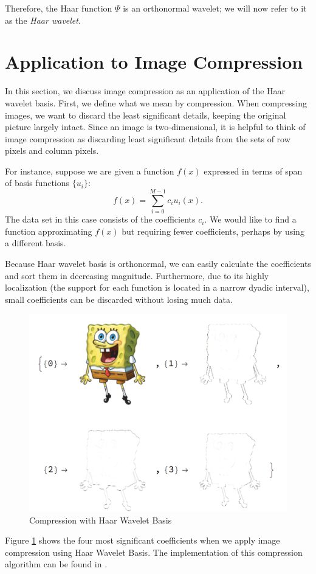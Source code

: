 \documentclass[11pt]{amsart}
\theoremstyle{theorem} %
\theoremstyle{definition}
\theoremstyle{example}
\theoremstyle{remark}
\numberwithin{equation}{section}
\begin{document}
Therefore, the Haar function $ \varPsi $ is an orthonormal wavelet; we will now refer to it as the \emph{Haar wavelet}.

\section{Application to Image Compression} \label{section:application}
In this section, we discuss image compression as an application of the Haar wavelet basis. First, we define what we mean by compression. When compressing images, we want to discard the least significant details, keeping the original picture largely intact. Since an image is two-dimensional, it is helpful to think of image compression as discarding least significant details from the sets of row pixels and column pixels. 

For instance, suppose we are given a function $ f(x) $ expressed in terms of span of basis functions $ \{ u_i \} $:
	\[ f(x) = \sum_{i=0}^{M-1} c_i u_i(x). \]
The data set in this case consists of the coefficients $ c_i $. We would like to find a function approximating $ f(x) $ but requiring fewer coefficients, perhaps by using a different basis.

Because Haar wavelet basis is orthonormal, we can easily calculate the coefficients and sort them in decreasing magnitude. Furthermore, due to its highly localization (the support for each function is located in a narrow dyadic interval), small coefficients can be discarded without losing much data.

\begin{figure}[h]
	\centering
	\includegraphics[width=0.7\linewidth]{img/s.png}
	\caption{Compression with Haar Wavelet Basis}
	\label{fig:s2}
\end{figure}

Figure \ref{fig:s2} shows the four most significant coefficients when we apply image compression using Haar Wavelet Basis. The implementation of this compression algorithm can be found in \cite{stollnitz}.

\printbibliography
\end{document}
